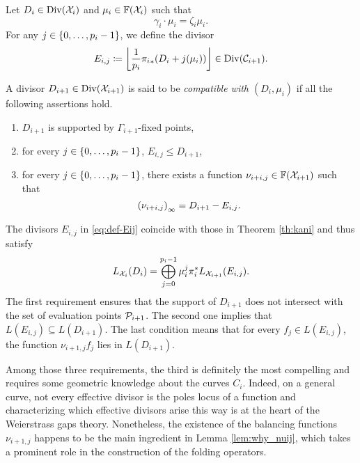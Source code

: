\documentclass[10pt]{article}
\begin{document}
\begin{definition}\label{def-div_compatible}
	Let $D_i \in \operatorname{Div}(\mathcal{X}_i)$ and $\mu_i \in \mathbb{F}(\mathcal{X}_i)$ such that 
	\begin{equation}\label{eq:def-mu_i}
		\gamma_i \cdot \mu_i = \zeta_i \mu_i.
	\end{equation} For any $j \in \left\{0,\dots,p_i-1\right\}$, we define the divisor 
	\begin{equation}\label{eq:def-Eij}
		E_{i,j}\coloneqq \left\lfloor\frac{1}{p_i}{\pi_i}_*( D_i + j(\mu_i))\right\rfloor \in \operatorname{Div}(\mathcal{C}_{i+1}).
	\end{equation}
	
	A divisor $D_{i+1} \in \operatorname{Div}(\mathcal{X}_{i+1})$ is said to be \emph{compatible with $(D_i,\mu_i)$} if all the following assertions hold.
	\begin{enumerate}
		\item $D_{i+1}$ is supported by $\Gamma_{i+1}$-fixed points, 
		\item for every $j \in \left\{0,\dots,p_i-1\right\}$, $E_{i,j} \leq D_{i+1}$,
		\item  for every $j \in \left\{0,\dots,p_i-1\right\}$, there exists a function $\nu_{i+i,j}\in \mathbb{F}(\mathcal{X}_{i+1})$ such that
		\begin{equation}\label{eq:def-nu_i,j}
			\left( \nu_{i+i,j} \right)_\infty=D_{i+1} - E_{i,j}.	
		\end{equation}
	\end{enumerate}
\end{definition}


The divisors $E_{i,j}$ in \eqref{eq:def-Eij} coincide with those in Theorem \ref{th:kani} and thus satisfy
\begin{equation}\label{eq:decomposition}
	L_{\mathcal{X}_i}(D_i)= \bigoplus_{j=0}^{p_i-1} \mu_i^j \pi_i^* L_{\mathcal{X}_{i+1}}(E_{i,j}).
\end{equation}
The first requirement ensures that the support of $D_{i+1}$ does not intersect with the set of evaluation points $\mathcal{P}_{i+1}$. The second one implies that $L(E_{i,j}) \subseteq L(D_{i+1})$. The last condition means that for every $f_j \in L(E_{i,j})$, the function $\nu_{i+1, j}f_j$ lies in $L(D_{i+1})$.

Among those three requirements, the third is definitely the most compelling and requires some geometric knowledge about the curves $C_i$. Indeed, on a general curve, not every effective divisor is the poles locus of a function and characterizing which effective divisors arise this way is at the heart of the Weierstrass gaps theory. Nonetheless, the existence of the balancing functions $\nu_{i+1,j}$ happens to be the main ingredient in Lemma \ref{lem:why_nuij}, which takes a prominent role in the construction of the folding operators.
\end{document}

